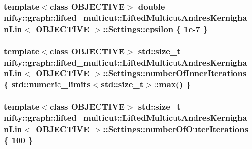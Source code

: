 \subsubsection[{epsilon}]{\setlength{\rightskip}{0pt plus 5cm}template$<$class O\+B\+J\+E\+C\+T\+I\+V\+E$>$ double {\bf nifty\+::graph\+::lifted\+\_\+multicut\+::\+Lifted\+Multicut\+Andres\+Kernighan\+Lin}$<$ O\+B\+J\+E\+C\+T\+I\+V\+E $>$\+::Settings\+::epsilon \{ 1e-\/7 \}}\label{structnifty_1_1graph_1_1lifted__multicut_1_1LiftedMulticutAndresKernighanLin_1_1Settings_a0e8bc6356e073e20817510f7ad3d8bb7}
\hypertarget{structnifty_1_1graph_1_1lifted__multicut_1_1LiftedMulticutAndresKernighanLin_1_1Settings_adf91dd1ffc25bdbdda52a07638c5439c}{}
\subsubsection[{number\+Of\+Inner\+Iterations}]{\setlength{\rightskip}{0pt plus 5cm}template$<$class O\+B\+J\+E\+C\+T\+I\+V\+E$>$ std\+::size\+\_\+t {\bf nifty\+::graph\+::lifted\+\_\+multicut\+::\+Lifted\+Multicut\+Andres\+Kernighan\+Lin}$<$ O\+B\+J\+E\+C\+T\+I\+V\+E $>$\+::Settings\+::number\+Of\+Inner\+Iterations \{ std\+::numeric\+\_\+limits$<$std\+::size\+\_\+t$>$\+::max() \}}\label{structnifty_1_1graph_1_1lifted__multicut_1_1LiftedMulticutAndresKernighanLin_1_1Settings_adf91dd1ffc25bdbdda52a07638c5439c}
\hypertarget{structnifty_1_1graph_1_1lifted__multicut_1_1LiftedMulticutAndresKernighanLin_1_1Settings_a6a0d3f421df17067764b6734e9dbae88}{}
\subsubsection[{number\+Of\+Outer\+Iterations}]{\setlength{\rightskip}{0pt plus 5cm}template$<$class O\+B\+J\+E\+C\+T\+I\+V\+E$>$ std\+::size\+\_\+t {\bf nifty\+::graph\+::lifted\+\_\+multicut\+::\+Lifted\+Multicut\+Andres\+Kernighan\+Lin}$<$ O\+B\+J\+E\+C\+T\+I\+V\+E $>$\+::Settings\+::number\+Of\+Outer\+Iterations \{ 100 \}}\label{structnifty_1_1graph_1_1lifted__multicut_1_1LiftedMulticutAndresKernighanLin_1_1Settings_a6a0d3f421df17067764b6734e9dbae88}


